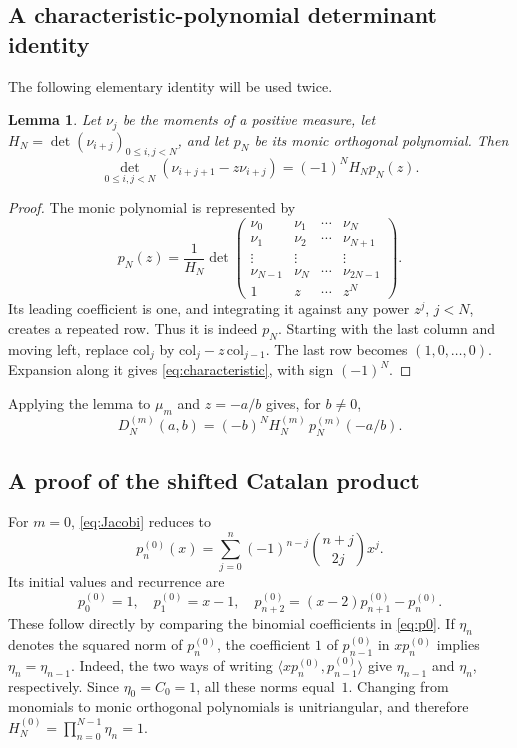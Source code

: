 \documentclass[11pt,a4paper]{article}
\numberwithin{equation}{section}
\newtheorem{lemma}[theorem]{Lemma}
\theoremstyle{definition}
\theoremstyle{remark}
\newcommand{\D}[2]{D_{#1}^{(#2)}}
\newcommand{\HH}[2]{H_{#1}^{(#2)}}
\begin{document}
\subsection{A characteristic-polynomial determinant identity}
The following elementary identity will be used twice.

\begin{lemma}\label{lem:characteristic}
Let $\nu_j$ be the moments of a positive measure, let
$H_N=\det(\nu_{i+j})_{0\leq i,j<N}$, and let $p_N$ be its monic orthogonal
polynomial.  Then
\begin{equation}\label{eq:characteristic}
 \det_{0\leq i,j<N}(\nu_{i+j+1}-z\nu_{i+j})
   =(-1)^N H_Np_N(z).
\end{equation}
\end{lemma}
\begin{proof}
The monic polynomial is represented by
\[
 p_N(z)=\frac1{H_N}
 \det\begin{pmatrix}
 \nu_0&\nu_1&\cdots&\nu_N\\
 \nu_1&\nu_2&\cdots&\nu_{N+1}\\
 \vdots&\vdots&&\vdots\\
 \nu_{N-1}&\nu_N&\cdots&\nu_{2N-1}\\
 1&z&\cdots&z^N
 \end{pmatrix}.
\]
Its leading coefficient is one, and integrating it against any power
$z^j$, $j<N$, creates a repeated row.  Thus it is indeed $p_N$.
Starting with the last column and moving left, replace
$\mathrm{col}_j$ by $\mathrm{col}_j-z\,\mathrm{col}_{j-1}$.
The last row becomes $(1,0,\ldots,0)$.  Expansion along it gives
\eqref{eq:characteristic}, with sign $(-1)^N$.
\end{proof}

Applying the lemma to $\mu_m$ and $z=-a/b$ gives, for $b\ne0$,
\begin{equation}\label{eq:characteristicD}
 \D{N}{m}(a,b)=(-b)^N\HH{N}{m}\,p_N^{(m)}(-a/b).
\end{equation}

\subsection{A proof of the shifted Catalan product}
For $m=0$, \eqref{eq:Jacobi} reduces to
\begin{equation}\label{eq:p0}
 p_n^{(0)}(x)=\sum_{j=0}^n(-1)^{n-j}\binom{n+j}{2j}x^j.
\end{equation}
Its initial values and recurrence are
\begin{equation}\label{eq:p0rec}
 p_0^{(0)}=1,\quad p_1^{(0)}=x-1,\quad
 p_{n+2}^{(0)}=(x-2)p_{n+1}^{(0)}-p_n^{(0)}.
\end{equation}
These follow directly by comparing the binomial coefficients in
\eqref{eq:p0}.  If $\eta_n$ denotes the squared norm of $p_n^{(0)}$, the
coefficient $1$ of $p_{n-1}^{(0)}$ in $xp_n^{(0)}$ implies
$\eta_n=\eta_{n-1}$.  Indeed, the two ways of writing
$\langle xp_n^{(0)},p_{n-1}^{(0)}\rangle$
give $\eta_{n-1}$ and $\eta_n$, respectively.  Since
$\eta_0=C_0=1$, all these norms equal~$1$.  Changing from monomials to
monic orthogonal polynomials is unitriangular, and therefore
$H_N^{(0)}=\prod_{n=0}^{N-1}\eta_n=1$.
\end{document}
